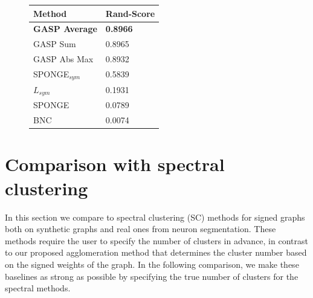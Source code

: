 \begin{figure}[t]
\centering
\begin{minipage}[t]{0.48\textwidth}
\vspace{0pt}
\centering
\begin{tabular}[t]{L{9em} M{7em}}
           Method & Rand-Score \\ \midrule
           \textbf{GASP Average} & \textbf{0.8966} \\
GASP Sum & 0.8965 \\
GASP Abs Max & 0.8932 \\
SPONGE$_{sym}$ \cite{Cucuringu2019SPONGEAG} & 0.5839\\
$L_{sym}$ \cite{kunegis2010spectral} & 0.1931 \\
SPONGE \cite{Cucuringu2019SPONGEAG} & 0.0789 \\
BNC \cite{chiang2012scalable} & 0.0074 \\
        \end{tabular}
    \label{tab:cremi_spectral_experiments}
\end{minipage}
\end{figure}


\section{Comparison with spectral clustering} \label{sec:spectral_clust}
In this section we compare \algname{} to spectral clustering (SC) methods for signed graphs both on synthetic graphs and real ones from neuron segmentation. These methods require the user to specify the number of clusters in advance, in contrast to our proposed agglomeration method that determines the cluster number based on the signed weights of the graph. In the following comparison, we make these baselines as strong as possible by specifying the true number of clusters for the spectral methods.

